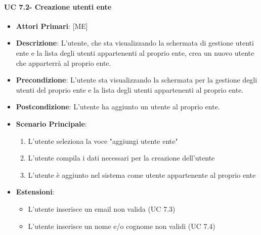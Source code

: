 			\paragraph{UC 7.2- Creazione utenti ente}
			\begin{itemize}
				\item \textbf{Attori Primari}: [ME]
				\item \textbf{Descrizione}: L'utente, che sta visualizzando la schermata di gestione utenti ente e la lista degli utenti appartenenti al proprio ente, crea un nuovo utente che apparterrà al proprio ente.
				\item \textbf{Precondizione}: L'utente sta visualizzando la schermata per la gestione degli utenti del proprio ente e la lista degli utenti appartenenti al proprio ente.
				\item \textbf{Postcondizione}: L'utente ha aggiunto un utente al proprio ente.
				\item \textbf{Scenario Principale}:
				\begin{enumerate}
					\item{L'utente seleziona la voce "aggiungi utente ente"}
					\item{L'utente compila i dati necessari per la creazione dell'utente}
					\item{L'utente è aggiunto nel sistema come utente appartenente al proprio ente}
				\end{enumerate}	
				\item \textbf{Estensioni}:
				\begin{itemize}
					\item L'utente inserisce un email non valida (UC 7.3)
					\item L'utente inserisce un nome e/o cognome non validi (UC 7.4)
				\end{itemize}
			\end{itemize}
			
